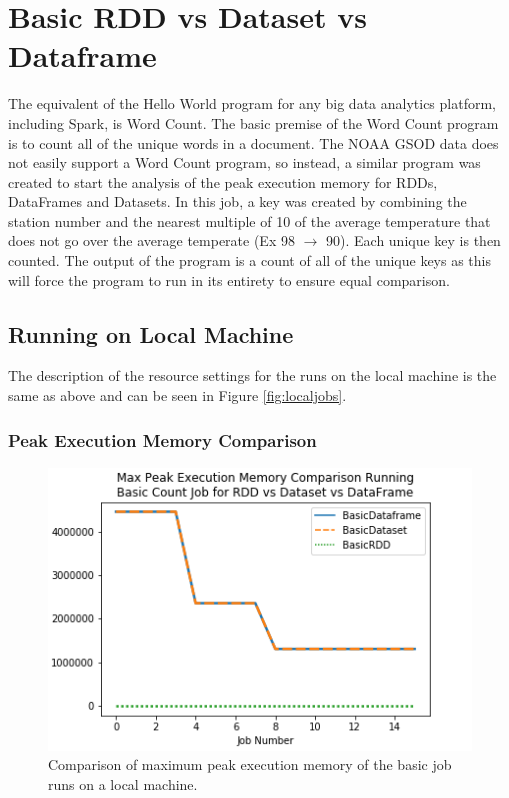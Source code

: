 \documentclass[conference]{IEEEtran}
\begin{document}

\section{Basic RDD vs Dataset vs Dataframe}\label{basicjobs}
The equivalent of the Hello World program for any big data analytics platform, including Spark, is Word Count.
The basic premise of the Word Count program is to count all of the unique words in a document.
The NOAA GSOD data does not easily support a Word Count program, so instead, a similar program was created to start the analysis of the peak execution memory for RDDs, DataFrames and Datasets.
In this job, a key was created by combining the station number and the nearest multiple of 10 of the average temperature that does not go over the average temperate (Ex 98 $\rightarrow$ 90).
Each unique key is then counted.
The output of the program is a count of all of the unique keys as this will force the program to run in its entirety to ensure equal comparison.

\subsection{Running on Local Machine}

The description of the resource settings for the runs on the local machine is the same as above and can be seen in Figure \ref{fig:localjobs}.


\subsubsection{Peak Execution Memory Comparison}
\begin{figure}
    \includegraphics[width=\linewidth]{../python_scripts/images/basicJobMaxPeakExecutionMemory.png}
    \caption{Comparison of maximum peak execution memory of the basic job runs on a local machine.}
    \label{fig:basicJobMaxPeakExecutionMemory}
\end{figure}
\end{document}
